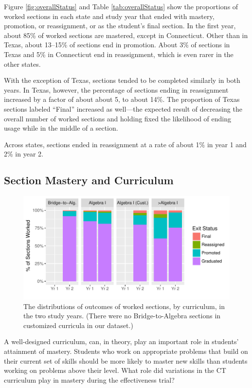 \documentclass[notitlepage,12pt]{jedm}\usepackage[]{graphicx}\usepackage[]{color}
\makeatletter
\def\maxwidth{ %
  \ifdim\Gin@nat@width>\linewidth
    \linewidth
  \else
    \Gin@nat@width
  \fi
}
\makeatother
\begin{document}
Figure \ref{fig:overallStatus} and Table \ref{tab:overallStatus} show
the proportions of worked sections in each state and study year that
ended with mastery, promotion, or reassignment, or as the
student's final section.
In the first year, about
85\% of
worked sections are mastered, except in Connecticut.
Other than in Texas, about
13--15\%
of sections end in promotion.
About 3\% of sections in Texas
and 5\%
in Connecticut end in reassignment, which is even rarer in the other states.

With the exception of Texas, sections tended to be completed similarly
in both years.
In Texas, however, the percentage of sections ending in reassignment increased by a factor
of about about
5,
to about 14\%.
The proportion of Texas sections labeled ``Final'' increased as
well---the expected result of decreasing the overall number of worked
sections and holding fixed the likelihood of ending
usage while in the middle of a section.

Across states, sections ended in reassignment at a rate of about
1\% in year 1 and
2\% in year 2.

\subsection{Section Mastery and Curriculum}
\begin{figure}
  \centering

\includegraphics[width=\maxwidth]{figure/statusCur-1} 

\caption{The distributions of outcomes of worked sections, by
  curriculum, in the two study years. (There were no Bridge-to-Algebra
sections in customized curricula in our dataset.)}
\label{fig:statusCur}
\end{figure}

A well-designed curriculum, can, in theory, play an important role in
students' attainment of mastery.
Students who work on appropriate problems that build on their current
set of skills should be more likely to master new skills than students
working on problems above their level.
What role did variations in the CT curriculum play in mastery during the effectiveness trial?
\end{document}
